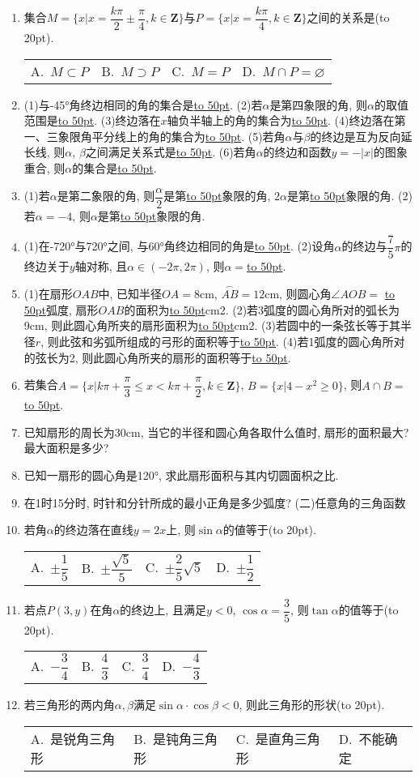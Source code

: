 \documentclass[10pt,a4paper]{article}
\newcommand{\blank}[1]{\underline{\hbox to #1pt{}}}
\newcommand{\bracket}[1]{(\hbox to #1pt{})}
\newcommand{\fourch}[4]{\par\begin{tabular}{p{.23\textwidth}p{.23\textwidth}p{.23\textwidth}p{.23\textwidth}}
A.~#1 &B.~#2& C.~#3& D.~#4
\end{tabular}}
\begin{document}
\begin{enumerate}[1.]
\item 集合$M=\{x|x=\dfrac{k\pi }2\pm \dfrac{\pi }4,k\in \mathbf{Z}\}$与$P=\{x|x=\dfrac{k\pi }4,k\in \mathbf{Z}\}$之间的关系是\bracket{20}.
\fourch{$M\subset P$}{$M\supset P$}{$M=P$}{$M\cap P=\varnothing$}
\item (1)与-45°角终边相同的角的集合是\blank{50}.
(2)若$\alpha$是第四象限的角, 则$\alpha$的取值范围是\blank{50}.
(3)终边落在$x$轴负半轴上的角的集合为\blank{50}.
(4)终边落在第一、三象限角平分线上的角的集合为\blank{50}.
(5)若角$\alpha$与$\beta$的终边是互为反向延长线, 则$\alpha$, $\beta$之间满足关系式是\blank{50}.
(6)若角$\alpha$的终边和函数$y=-|x|$的图象重合, 则$\alpha$的集合是\blank{50}.
\item (1)若$\alpha$是第二象限的角, 则$\dfrac{\alpha }2$是第\blank{50}象限的角, $2\alpha$是第\blank{50}象限的角.
(2)若$\alpha =-4$, 则$\alpha$是第\blank{50}象限的角.
\item (1)在-720°与720°之间, 与60°角终边相同的角是\blank{50}.
(2)设角$\alpha$的终边与$\dfrac 75\pi$的终边关于$y$轴对称, 且$\alpha \in (-2\pi ,2\pi)$, 则$\alpha =$\blank{50}.
\item (1)在扇形$OAB$中, 已知半径$OA=8$cm, $\overset\frown{AB}=12$cm, 则圆心角$\angle AOB=$		\blank{50}弧度, 扇形$OAB$的面积为\blank{50}cm2.
(2)若3弧度的圆心角所对的弧长为9cm, 则此圆心角所夹的扇形面积为\blank{50}cm2.
(3)若圆中的一条弦长等于其半径$r$, 则此弦和劣弧所组成的弓形的面积等于\blank{50}.
(4)若1弧度的圆心角所对的弦长为2, 则此圆心角所夹的扇形的面积等于\blank{50}.
\item 若集合$A=\{x|k\pi +\dfrac{\pi }3\le x<k\pi +\dfrac{\pi }2,k\in \mathbf{Z}\}$, $B=\{x|4-x^2\ge 0\}$, 则$A\cap B=$\blank{50}.
\item 已知扇形的周长为30cm, 当它的半径和圆心角各取什么值时, 扇形的面积最大? 最大面积是多少?
\item 已知一扇形的圆心角是120°, 求此扇形面积与其内切圆面枳之比.
\item 在1时15分时, 时针和分针所成的最小正角是多少弧度?
(二)任意角的三角函数
\item 若角$\alpha$的终边落在直线$y=2x$上, 则$\sin \alpha$的値等于\bracket{20}.
\fourch{$\pm \dfrac 15$}{$\pm \dfrac{\sqrt 5}5$}{$\pm \dfrac 25\sqrt 5$}{$\pm \dfrac 12$}
\item 若点$P(3,y)$在角$\alpha$的终边上, 且满足$y<0$, $\cos \alpha =\dfrac 35$, 则$\tan \alpha$的值等于\bracket{20}.
\fourch{$-\dfrac 34$}{$\dfrac 43$}{$\dfrac 34$}{$-\dfrac 43$}
\item 若三角形的两内角$\alpha ,\beta$满足$\sin \alpha \cdot \cos \beta <0$, 则此三角形的形状\bracket{20}.
\fourch{是锐角三角形}{是钝角三角形}{是直角三角形}{不能确定}

\end{enumerate}
\end{document}
